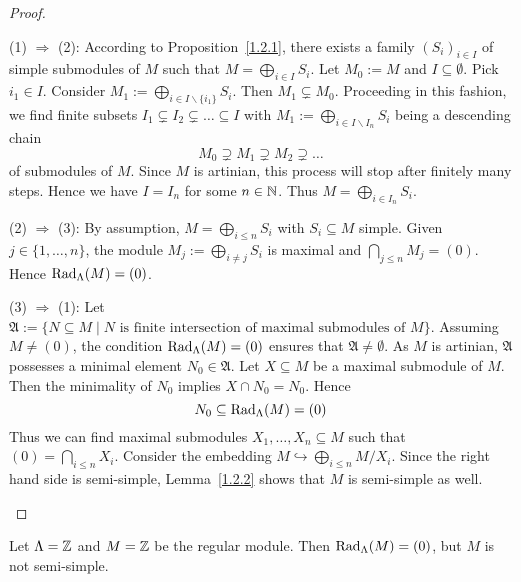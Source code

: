 \begin{proof}\
\begin{addmargin}[1cm]{0cm}

\hspace*{-1cm}(1) $\Rightarrow$ (2): According to Proposition~\ref{1.2.1}, there exists a family $(S_i)_{i\in I}$ of simple submodules of $M$ such that $M=\bigoplus_{i\in I} S_i$. Let $M_0:=M$ and $I\subseteq \emptyset$. Pick $i_1\in I$. Consider $M_1 := \bigoplus_{i\in I\smallsetminus \{i_1\}} S_i$. Then $M_1\subsetneq M_0$. Proceeding in this fashion, we find finite subsets $I_1\subsetneq I_2\subsetneq \dots\subseteq I$ with $M_1 := \bigoplus_{i\in I\smallsetminus I_n} S_i$ being a descending chain
\[
M_0 \supsetneq M_1\supsetneq M_2\supsetneq \dots
\]
of submodules of $M$. Since $M$ is artinian, this process will stop after finitely many steps. Hence we have $I=I_n$ for some $n\in\mathbb{N}$. Thus $M=\bigoplus_{i\in I_n} S_i$.

\hspace*{-1cm}(2) $\Rightarrow$ (3): By assumption, $M=\bigoplus_{i\le n} S_i$ with $S_i\subseteq M$ simple. Given $j\in\{1,\dots,n\}$, the module $M_j:= \bigoplus_{i\neq j} S_i$ is maximal and $\bigcap_{j\le n} M_j =(0)$. Hence $\operatorname{Rad}_\Lambda(M)=(0)$.

\hspace*{-1cm}(3) $\Rightarrow$ (1): Let $\mathfrak A := \{ N\subseteq M \mid N \text{ is finite intersection of maximal submodules of } M \}$. Assuming $M\neq (0)$, the condition $\operatorname{Rad}_\Lambda(M)=(0)$ ensures that $\mathfrak A\neq\emptyset$. As $M$ is artinian, $\mathfrak A$ possesses a minimal element $N_0\in\mathfrak A$. Let $X\subseteq M$ be a maximal submodule of $M$. Then the minimality of $N_0$ implies $X\cap N_0=N_0$. Hence
\[
N_0\subseteq \operatorname{Rad}_\Lambda(M)=(0)
\]
Thus we can find maximal submodules $X_1,\dots,X_n\subseteq M$ such that $(0)=\bigcap_{i\le n} X_i$. Consider the embedding $M\hookrightarrow \bigoplus_{i\le n} M/X_i$. Since the right hand side is semi-simple, Lemma~\ref{1.2.2} shows that $M$ is semi-simple as well.\qedhere
\end{addmargin}
\end{proof}


\begin{remark}
Let $\Lambda=\mathbb{Z}$ and $M=\mathbb{Z}$ be the regular module. Then $\operatorname{Rad}_\Lambda(M)=(0)$, but $M$ is not semi-simple.
\end{remark}

